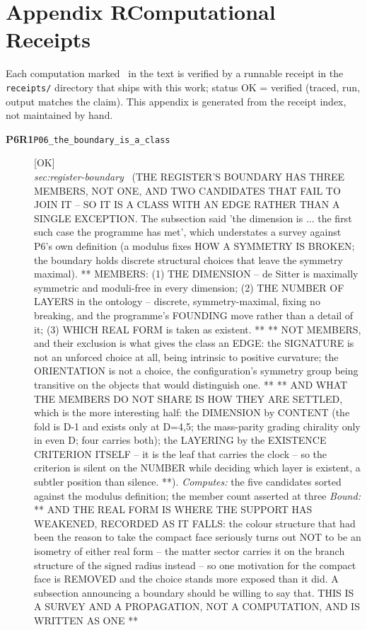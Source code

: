 \clearpage
\section*{Appendix R\quad Computational Receipts}\label{app:receipts}
\small\noindent Each computation marked \rcptmarker\ in the text is verified by a runnable receipt in the \texttt{receipts/} directory that ships with this work; status \textsf{OK} = verified (traced, run, output matches the claim). This appendix is generated from the receipt index, not maintained by hand.\par\medskip
\begingroup\renewcommand{\arraystretch}{1.25}
\begin{description}
\item[\textbf{P6R1}\quad\texttt{P06\_the\_boundary\_is\_a\_class}]\hfill\textsf{[OK]}\\
\textit{sec:register-boundary} \ (THE REGISTER'S BOUNDARY HAS THREE MEMBERS, NOT ONE, AND TWO CANDIDATES THAT FAIL TO JOIN IT -- SO IT IS A CLASS WITH AN EDGE RATHER THAN A SINGLE EXCEPTION. The subsection said 'the dimension is ... the first such case the programme has met', which understates a survey against P6's own definition (a modulus fixes HOW A SYMMETRY IS BROKEN; the boundary holds discrete structural choices that leave the symmetry maximal). ** MEMBERS: (1) THE DIMENSION -- de Sitter is maximally symmetric and moduli-free in every dimension; (2) THE NUMBER OF LAYERS in the ontology -- discrete, symmetry-maximal, fixing no breaking, and the programme's FOUNDING move rather than a detail of it; (3) WHICH REAL FORM is taken as existent. ** ** NOT MEMBERS, and their exclusion is what gives the class an EDGE: the SIGNATURE is not an unforced choice at all, being intrinsic to positive curvature; the ORIENTATION is not a choice, the configuration's symmetry group being transitive on the objects that would distinguish one. ** ** AND WHAT THE MEMBERS DO NOT SHARE IS HOW THEY ARE SETTLED, which is the more interesting half: the DIMENSION by CONTENT (the fold is D-1 and exists only at D=4,5; the mass-parity grading chirality only in even D; four carries both); the LAYERING by the EXISTENCE CRITERION ITSELF -- it is the leaf that carries the clock -- so the criterion is silent on the NUMBER while deciding which layer is existent, a subtler position than silence. **). 
\emph{Computes:} the five candidates sorted against the modulus definition; the member count asserted at three
 \emph{Bound:} ** AND THE REAL FORM IS WHERE THE SUPPORT HAS WEAKENED, RECORDED AS IT FALLS: the colour structure that had been the reason to take the compact face seriously turns out NOT to be an isometry of either real form -- the matter sector carries it on the branch structure of the signed radius instead -- so one motivation for the compact face is REMOVED and the choice stands more exposed than it did. A subsection announcing a boundary should be willing to say that. THIS IS A SURVEY AND A PROPAGATION, NOT A COMPUTATION, AND IS WRITTEN AS ONE **

\end{description}

